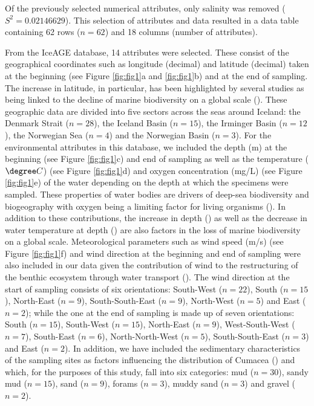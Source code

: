 Of the previously selected numerical attributes, only salinity was removed (\( S^2 = 0.02146629 \)). This selection of attributes and data resulted in a data table containing 62 rows (\( n=62 \)) and 18 columns (number of attributes). 

From the IceAGE database, 14 attributes were selected. These consist of the geographical coordinates such as longitude (decimal) and latitude (decimal) taken at the beginning (see Figure \ref{fig:fig1}a and \ref{fig:fig1}b) and at the end of sampling. The increase in latitude, in particular, has been highlighted by several studies as being linked to the decline of marine biodiversity on a global scale (\citep{lambshead_latitudinal_2000, gage_diversity_2004}). These geographic data are divided into five sectors across the seas around Iceland: the Denmark Strait (\( n=28 \)), the Iceland Basin (\( n=15 \)), the Irminger Basin (\( n=12 \)), the Norwegian Sea (\( n=4 \)) and the Norwegian Basin (\( n=3 \)). For the environmental attributes in this database, we included the depth (m) at the beginning (see Figure \ref{fig:fig1}c) and end of sampling as well as the temperature (\( \degree C \)) (see Figure \ref{fig:fig1}d) and oxygen concentration (mg/L) (see Figure \ref{fig:fig1}e) of the water depending on the depth at which the specimens were sampled. These properties of water bodies are drivers of deep-sea biodiversity and biogeography with oxygen being a limiting factor for living organisms (\citep{keeling_ocean_2010}). In addition to these contributions, the increase in depth (\citep{rex_global_2006, costello_marine_2017}) as well as the decrease in water temperature at depth (\citep{lambshead_latitudinal_2000}) are also factors in the loss of marine biodiversity on a global scale. Meteorological parameters such as wind speed (m/s) (see Figure \ref{fig:fig1}f) and wind direction at the beginning and end of sampling were also included in our data given the contribution of wind to the restructuring of the benthic ecosystem through water transport (\citep{waga_recent_2020, saeedi_environmental_2022}). The wind direction at the start of sampling consists of six orientations: South-West (\( n=22 \)), South (\( n=15 \)), North-East (\( n=9 \)), South-South-East (\( n=9 \)), North-West (\( n=5 \)) and East (\( n=2 \)); while the one at the end of sampling is made up of seven orientations: South (\( n=15 \)), South-West (\( n=15 \)), North-East (\( n=9 \)), West-South-West (\( n=7 \)), South-East (\( n=6 \)), North-North-West (\( n=5 \)), South-South-East (\( n=3 \)) and East (\( n=2 \)). In addition, we have included the sedimentary characteristics of the sampling sites as factors influencing the distribution of Cumacea (\citep{uhlir_adding_2021}) and which, for the purposes of this study, fall into six categories: mud (\( n=30 \)), sandy mud (\( n=15 \)), sand (\( n=9 \)), forams (\( n=3 \)), muddy sand (\( n=3 \)) and gravel (\( n=2 \)).

